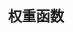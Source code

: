 \documentclass{beamer}%
\begin{document}
\begin{frame}
    \vspace{-0.1cm}
    {\noindent\large\textbf{权重函数}}
    \vspace{0.4cm}




    \begin{columns}
        \vspace{-0.5cm}
        \begin{column}{0.6\linewidth}


\end{column}
\end{columns}
\end{frame}
\end{document}
